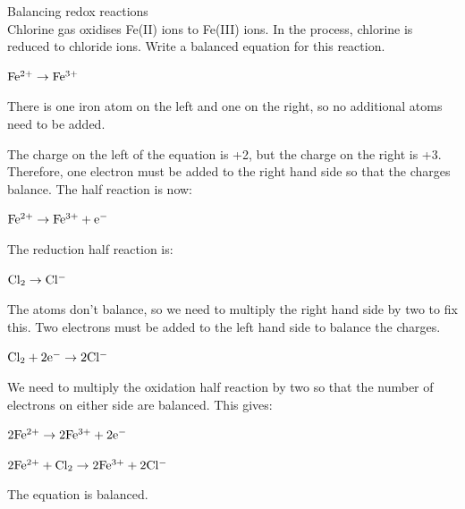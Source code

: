 \begin{wex}{Balancing redox reactions\\}{Chlorine gas oxidises Fe(II) ions to Fe(III) ions. In the process, chlorine is reduced to chloride ions. Write a balanced equation for this reaction.\\}

{

\begin{center}
$\rm{Fe^{2+} \rightarrow Fe^{3+}}$\\
\end{center}

There is one iron atom on the left and one on the right, so no additional atoms need to be added.\\

The charge on the left of the equation is +2, but the charge on the right is +3. Therefore, one electron must be added to the right hand side so that the charges balance. The half reaction is now:

\begin{center}
$\rm{Fe^{2+} \rightarrow Fe^{3+} + e^{-}}$\\
\end{center}

The reduction half reaction is:

\begin{center}
$\rm{Cl_{2} \rightarrow Cl^{-}}$
\end{center}

The atoms don't balance, so we need to multiply the right hand side by two to fix this. Two electrons must be added to the left hand side to balance the charges.

\begin{center}
$\rm{Cl_{2} + 2e^{-} \rightarrow 2Cl^{-}}$
\end{center}

We need to multiply the oxidation half reaction by two so that the number of electrons on either side are balanced. This gives:

\begin{center}
$\rm{2Fe^{2+} \rightarrow 2Fe^{3+} + 2e^{-}}$\\
\end{center}

\begin{center}
$\rm{2Fe^{2+} + Cl_{2} \rightarrow 2Fe^{3+} + 2Cl^{-}}$\\
\end{center}
The equation is balanced.
}
\end{wex}

